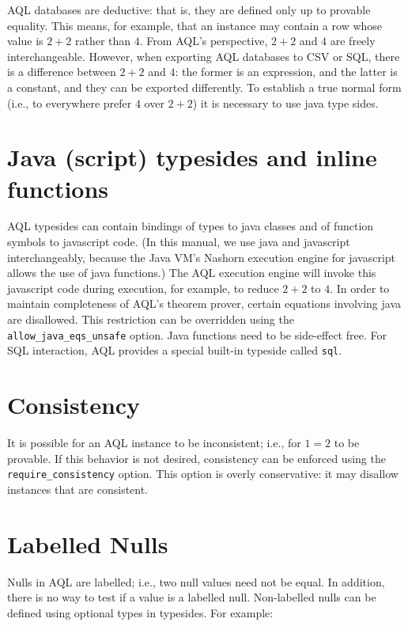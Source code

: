 \documentclass[10pt]{book}
\begin{document}
AQL databases are deductive: that is, they are defined only up to provable equality.  This means, for example, that an instance may contain a row whose value is $2+2$ rather than $4$.  From AQL's perspective, $2+2$ and $4$ are freely interchangeable.  However, when exporting AQL databases to CSV or SQL, there is a difference between $2+2$ and $4$: the former is an expression, and the latter is a constant, and they can be exported differently.  To establish a true normal form (i.e., to everywhere prefer $4$ over $2+2$) it is necessary to use java type sides.

\section{Java (script) typesides and inline functions}

AQL typesides can contain bindings of types to java classes and of function symbols to javascript code.  (In this manual, we use java and javascript interchangeably, because the Java VM's Nashorn execution engine for javascript allows the use of java functions.)  The AQL execution engine will invoke this javascript code during execution, for example, to reduce $2+2$ to $4$.  In order to maintain completeness of AQL's theorem prover, certain equations involving java are disallowed.  This restriction can be overridden using the {\tt allow\_java\_eqs\_unsafe} option.  Java functions need to be side-effect free.  For SQL interaction, AQL provides a special built-in typeside called {\tt sql}.  

\section{Consistency}

It is possible for an AQL instance to be inconsistent; i.e., for $1 = 2$ to be provable.  If this behavior is not desired, consistency can be enforced using the {\tt require\_consistency} option.  This option is overly conservative: it may disallow instances that are consistent.

\section{Labelled Nulls}

Nulls in AQL are labelled; i.e., two null values need not be equal.  In addition, there is no way to test if a value is a labelled null.  Non-labelled nulls can be defined using optional types in typesides.  For example:
\end{document}
